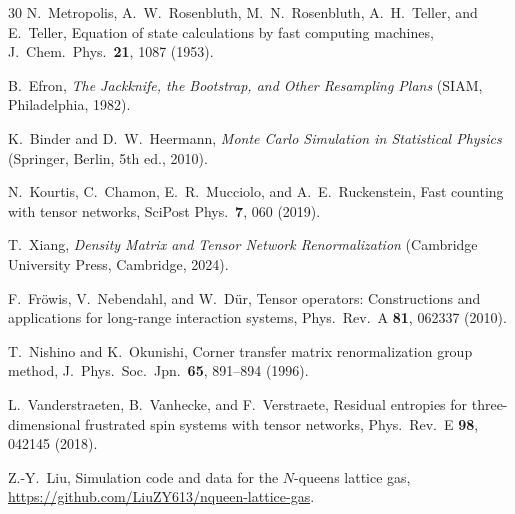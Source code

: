 \documentclass[aps, pre, reprint, amsmath, amssymb, superscriptaddress, floatfix]{revtex4-2}
\begin{document}
\begin{thebibliography}{30}
N.~Metropolis, A.~W.~Rosenbluth, M.~N.~Rosenbluth, A.~H.~Teller,
and E.~Teller,
Equation of state calculations by fast computing machines,
J.~Chem.~Phys.\ \textbf{21}, 1087 (1953).

B.~Efron,
\textit{The Jackknife, the Bootstrap, and Other Resampling Plans}
(SIAM, Philadelphia, 1982).

K.~Binder and D.~W.~Heermann,
\textit{Monte Carlo Simulation in Statistical Physics}
(Springer, Berlin, 5th ed., 2010).

N.~Kourtis, C.~Chamon, E.~R.~Mucciolo, and A.~E.~Ruckenstein,
Fast counting with tensor networks,
SciPost Phys.\ \textbf{7}, 060 (2019).

T.~Xiang,
\textit{Density Matrix and Tensor Network Renormalization}
(Cambridge University Press, Cambridge, 2024).

F.~Fr\"owis, V.~Nebendahl, and W.~D\"ur,
Tensor operators: Constructions and applications for long-range
interaction systems,
Phys.\ Rev.\ A \textbf{81}, 062337 (2010).

T.~Nishino and K.~Okunishi,
Corner transfer matrix renormalization group method,
J.~Phys.\ Soc.\ Jpn.\ \textbf{65}, 891--894 (1996).

L.~Vanderstraeten, B.~Vanhecke, and F.~Verstraete,
Residual entropies for three-dimensional frustrated spin systems with
tensor networks,
Phys.\ Rev.\ E \textbf{98}, 042145 (2018).

Z.-Y.~Liu,
Simulation code and data for the $N$-queens lattice gas,
\url{https://github.com/LiuZY613/nqueen-lattice-gas}.

\end{thebibliography}
\end{document}
